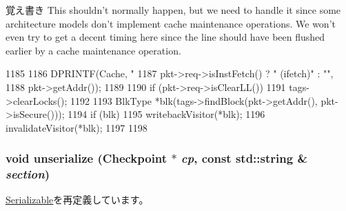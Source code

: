 \begin{DoxyNote}{覚え書き}
This shouldn't normally happen, but we need to handle it since some architecture models don't implement cache maintenance operations. We won't even try to get a decent timing here since the line should have been flushed earlier by a cache maintenance operation. 
\end{DoxyNote}



\begin{DoxyCode}
1185 {
1186     DPRINTF(Cache, "%
1187             pkt->req->isInstFetch() ? " (ifetch)" : "",
1188             pkt->getAddr());
1189 
1190     if (pkt->req->isClearLL())
1191         tags->clearLocks();
1192 
1193     BlkType *blk(tags->findBlock(pkt->getAddr(), pkt->isSecure()));
1194     if (blk) {
1195         writebackVisitor(*blk);
1196         invalidateVisitor(*blk);
1197     }
1198 }
\end{DoxyCode}
\hypertarget{classCache_af22e5d6d660b97db37003ac61ac4ee49}{
\subsubsection[{unserialize}]{\setlength{\rightskip}{0pt plus 5cm}void unserialize ({\bf Checkpoint} $\ast$ {\em cp}, \/  const std::string \& {\em section})}}
\label{classCache_af22e5d6d660b97db37003ac61ac4ee49}


\hyperlink{classSerializable_af100c4e9feabf3cd918619c88c718387}{Serializable}を再定義しています。


